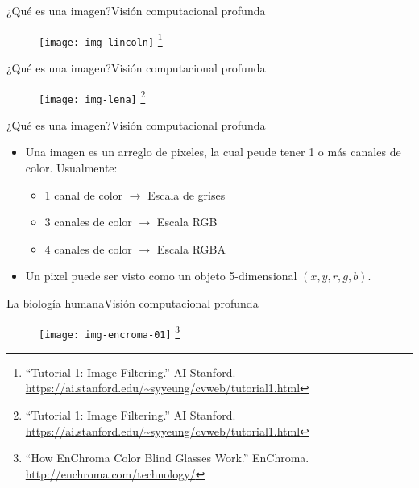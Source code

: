 \documentclass[10pt,border=3pt,tikz]{beamer}
\begin{document}
    \begin{frame}{¿Qué es una imagen?}{Visión computacional profunda}
        \begin{figure}
            \centering
            \texttt{[image: img-lincoln]}
            \let\thefootnote\relax\footnote{{\tiny “Tutorial 1: Image Filtering.” AI Stanford. \url{https://ai.stanford.edu/~syyeung/cvweb/tutorial1.html}}}
        \end{figure}
    \end{frame}
    
    \begin{frame}{¿Qué es una imagen?}{Visión computacional profunda}
        \begin{figure}
            \centering
            \texttt{[image: img-lena]}
            \let\thefootnote\relax\footnote{{\tiny “Tutorial 1: Image Filtering.” AI Stanford. \url{https://ai.stanford.edu/~syyeung/cvweb/tutorial1.html}}}
        \end{figure}
    \end{frame}
    
    \begin{frame}{¿Qué es una imagen?}{Visión computacional profunda}
        \begin{itemize}
            \item Una imagen es un arreglo de pixeles, la cual peude tener 1 o más canales de color. Usualmente:
            \begin{itemize}
                \item 1 canal de color $\rightarrow$ Escala de grises
                \item 3 canales de color $\rightarrow$ Escala RGB
                \item 4 canales de color $\rightarrow$ Escala RGBA
            \end{itemize}
            \item Un pixel puede ser visto como un objeto 5-dimensional $(x, y, r, g, b)$.
        \end{itemize}
    \end{frame}
    
    \begin{frame}{La biología humana}{Visión computacional profunda}
        \begin{figure}
            \centering
            \texttt{[image: img-encroma-01]}
            \let\thefootnote\relax\footnote{{\tiny “How EnChroma Color Blind Glasses Work.” EnChroma. \url{http://enchroma.com/technology/}}}
        \end{figure}
    \end{frame}
    
\end{document}

